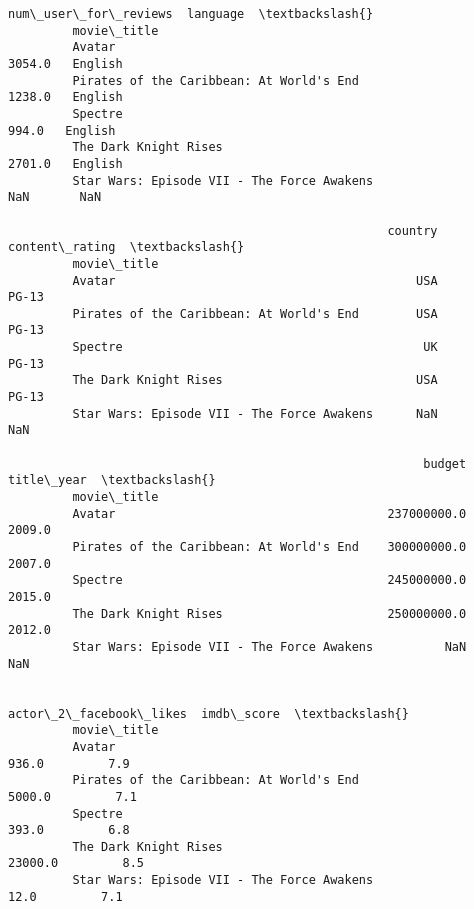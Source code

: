 \documentclass[11pt]{article}
\begin{document}
\begin{Verbatim}[commandchars=\\\{\}]
                                                    num\_user\_for\_reviews  language  \textbackslash{}
         movie\_title                                                                 
         Avatar                                                   3054.0   English   
         Pirates of the Caribbean: At World's End                 1238.0   English   
         Spectre                                                   994.0   English   
         The Dark Knight Rises                                    2701.0   English   
         Star Wars: Episode VII - The Force Awakens                  NaN       NaN   
         
                                                     country content\_rating  \textbackslash{}
         movie\_title                                                          
         Avatar                                          USA          PG-13   
         Pirates of the Caribbean: At World's End        USA          PG-13   
         Spectre                                          UK          PG-13   
         The Dark Knight Rises                           USA          PG-13   
         Star Wars: Episode VII - The Force Awakens      NaN            NaN   
         
                                                          budget title\_year  \textbackslash{}
         movie\_title                                                          
         Avatar                                      237000000.0     2009.0   
         Pirates of the Caribbean: At World's End    300000000.0     2007.0   
         Spectre                                     245000000.0     2015.0   
         The Dark Knight Rises                       250000000.0     2012.0   
         Star Wars: Episode VII - The Force Awakens          NaN        NaN   
         
                                                    actor\_2\_facebook\_likes  imdb\_score  \textbackslash{}
         movie\_title                                                                     
         Avatar                                                      936.0         7.9   
         Pirates of the Caribbean: At World's End                   5000.0         7.1   
         Spectre                                                     393.0         6.8   
         The Dark Knight Rises                                     23000.0         8.5   
         Star Wars: Episode VII - The Force Awakens                   12.0         7.1   
         

\end{Verbatim}
\end{document}
